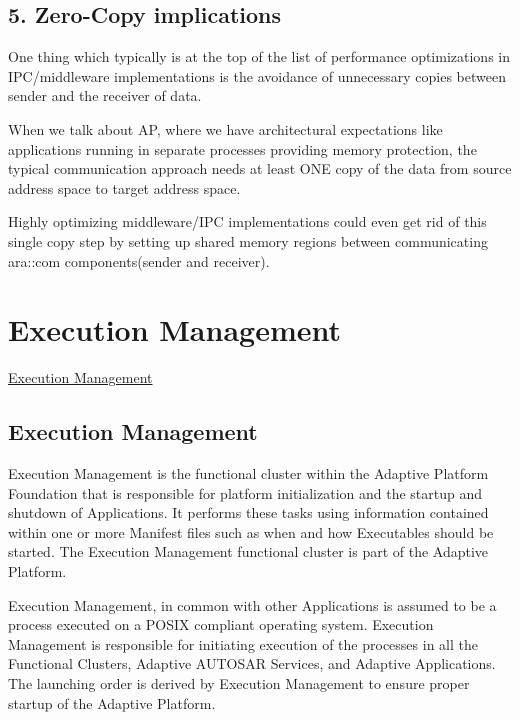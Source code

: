 \subsection*{5. Zero-\/\+Copy implications}


\begin{DoxyItemize}
\item One thing which typically is at the top of the list of performance optimizations in I\+P\+C/middleware implementations is the avoidance of unnecessary copies between sender and the receiver of data.
\item When we talk about AP, where we have architectural expectations like applications running in separate processes providing memory protection, the typical communication approach needs at least O\+NE copy of the data from source address space to target address space.
\item Highly optimizing middleware/\+I\+PC implementations could even get rid of this single copy step by setting up shared memory regions between communicating ara\+::com components(sender and receiver). 
\end{DoxyItemize}\hypertarget{adaptive_executionmanagement}{}\section{Execution Management}\label{adaptive_executionmanagement}

\begin{DoxyItemize}
\item \hyperlink{execution_management}{Execution Management} 
\end{DoxyItemize}\hypertarget{execution_management}{}\subsection{Execution Management}\label{execution_management}
Execution Management is the functional cluster within the Adaptive Platform Foundation that is responsible for platform initialization and the startup and shutdown of Applications. It performs these tasks using information contained within one or more Manifest files such as when and how Executables should be started. The Execution Management functional cluster is part of the Adaptive Platform.

Execution Management, in common with other Applications is assumed to be a process executed on a P\+O\+S\+IX compliant operating system. Execution Management is responsible for initiating execution of the processes in all the Functional Clusters, Adaptive A\+U\+T\+O\+S\+AR Services, and Adaptive Applications. The launching order is derived by Execution Management to ensure proper startup of the Adaptive Platform.

